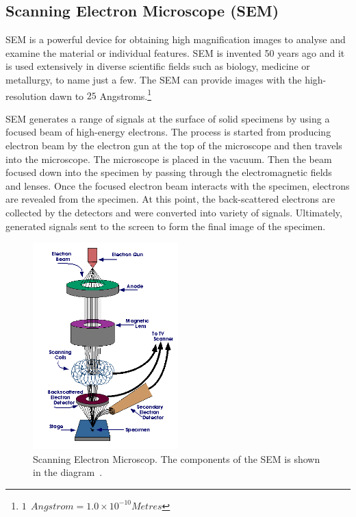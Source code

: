 \documentclass[12pt,a4paper,titlepage]{report}
\begin{document}
\subsection{Scanning Electron Microscope (\ac*{SEM})}\label{sem}

\ac*{SEM} is a powerful device for obtaining high magnification images to analyse and examine
 the material or individual features. \ac*{SEM} is invented 50 years ago and it is used extensively 
in diverse scientific fields such as biology, medicine or metallurgy,  to name just a few. The \ac*{SEM} can 
provide images with the high-resolution dawn to $25$ Angstroms.\footnote{$1 ~\ Angstrom =
1.0 \times 10^{-10} Metres$}%

\ac*{SEM} generates a range of signals at the surface of solid specimens by using a focused beam
 of high-energy electrons. The process is started from producing electron beam by the electron gun 
at the top of the microscope and then travels into the microscope. The microscope is placed in the
 vacuum. Then the beam focused down into the specimen by passing through the electromagnetic
 fields and lenses. Once the focused electron beam interacts with the specimen, electrons are revealed 
from the specimen. At this point, the back-scattered electrons are collected by the detectors and were 
converted into variety of signals. Ultimately, generated signals sent to the screen to form the final image 
of the specimen\citep{Doe:2014Jan:Online}. 


\begin{figure}
  \begin{center}
    \includegraphics[width=0.5\textwidth]{SEM}
  \caption{Scanning Electron Microscop. The components of the \ac*{SEM} is shown 
in the diagram~\citep{Doe:2014Jan:Online}.}
  \label{SEM}
\end{center}
\end{figure}
\end{document}
